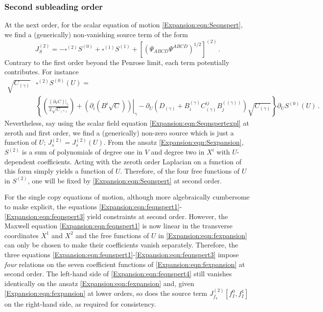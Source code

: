 \subsubsection*{Second subleading order} At the next order, for the scalar equation of motion \eqref{Expansion:eqn:Seqnspert}, we find a (generically) non-vanishing source term of the form
\begin{equation}
J_S^{(2)} =  -\square^{(2)}S^{(0)} + \square^{(1)}S^{(1)}+ \left[\left(\Psi_{ABCD} \Psi^{ABCD}\right)^{1/2}\right]^{(2)} \, .
\end{equation}
Contrary to the first order beyond the Penrose limit, each term potentially contributes. For instance
\begin{equation}
\begin{aligned}
\sqrt{C_{(\gamma)}} &\square^{(2)}S^{(0)}(U) = \\ & \left\lbrace  \left(\frac{\left(\partial_V C\right)|_{\gamma}}{2\sqrt{C_{(\gamma)}}}\right) +\left. \left(\partial_i(B^i \sqrt{C})\right)\right|_{\gamma}  -  \partial_U \left(D_{(\gamma)} + B^{(\gamma)}_i C^{ij}_{(\gamma)} B^{((\gamma))}_j \right) \sqrt{C_{(\gamma)}} \right\rbrace \partial_U S^{(0)}(U) \, .
\end{aligned}
\end{equation}
Nevertheless, say using the scalar field equation \eqref{Expansion:eqn:Seqnspertexpl} at zeroth and first order, we find a (generically) non-zero source which is just a function of $U$; $J_s^{(2)} = J_s^{(2)}(U)$. From the ansatz \eqref{Expansion:eqn:Sexpansion}, $S^{(2)}$ is a sum of polynomials of degree one in $V$ and degree two in $X^i$ with $U$-dependent coefficients. Acting with the zeroth order Laplacian on a function of this form simply yields a function of $U$. Therefore, of the four free functions of $U$ in $S^{(2)}$, one will be fixed by \eqref{Expansion:eqn:Seqnspert} at second order. 

For the single copy equations of motion, although more algebraically cumbersome to make explicit, the equations \eqref{Expansion:eqn:feqnspert1}-\eqref{Expansion:eqn:feqnspert3} yield constraints at second order. However, the Maxwell equation \eqref{Expansion:eqn:feqnspert1} is now linear in the transverse coordinates $X^1$ and $X^2$ and the free functions of $U$ in \eqref{Expansion:eqn:fexpansion} can only be chosen to make their coefficients vanish separately. Therefore, the three equations \eqref{Expansion:eqn:feqnspert1}-\eqref{Expansion:eqn:feqnspert3} impose \emph{four} relations on the seven coefficient functions of  \eqref{Expansion:eqn:fexpansion} at second order.  The left-hand side of \eqref{Expansion:eqn:feqnspert4} still vanishes identically on the ansatz \eqref{Expansion:eqn:fexpansion} and, given \eqref{Expansion:eqn:fexpansion} at lower orders, so does the source term  $J^{(2)}_{f_4}[f^{0}_I, f^{1}_I]$ on the right-hand side, as required for consistency.

